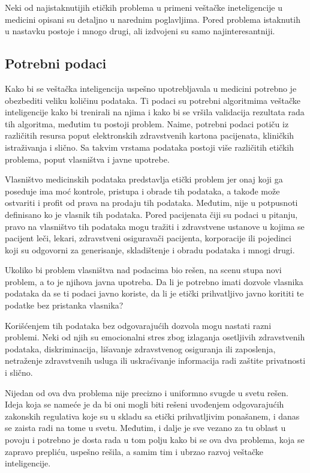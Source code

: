 \documentclass[a4paper]{article}
\begin{document}
Neki od najistaknutijih etičkih problema u primeni veštačke ineteligencije u medicini opisani su detaljno u narednim poglavljima. Pored problema istaknutih u nastavku postoje i mnogo drugi, ali izdvojeni su samo najinteresantniji.

\subsection{Potrebni podaci}
\label{subsec:poreklo_podataka}

Kako bi se veštačka inteligencija uspešno upotrebljavala u medicini potrebno je obezbediti veliku količinu podataka. Ti podaci su potrebni algoritmima veštačke inteligencije kako bi trenirali na njima i kako bi se vršila validacija rezultata rada tih algoritma, međutim tu postoji problem. Naime, potrebni podaci potiču iz različitih resursa poput elektronskih zdravstvenih kartona pacijenata, kliničkih istraživanja i slično. Sa takvim vrstama podataka postoji više različitih etičkih problema, poput vlasništva i javne upotrebe.

Vlasništvo medicinskih podataka predstavlja etički problem jer onaj koji ga poseduje ima moć kontrole, pristupa i obrade tih podataka, a takođe može ostvariti i profit od prava na prodaju tih podataka. Međutim, nije u potpusnoti definisano ko je vlasnik tih podataka. Pored pacijenata čiji su podaci u pitanju, pravo na vlasništvo tih podataka mogu tražiti i zdravstvene ustanove u kojima se pacijent leči, lekari, zdravstveni osiguravači pacijenta, korporacije ili pojedinci koji su odgovorni za generisanje, skladištenje i obradu podataka i mnogi drugi.

Ukoliko bi problem vlasništva nad podacima bio rešen, na scenu stupa novi problem, a to je njihova javna upotreba. Da li je potrebno imati dozvole vlasnika podataka da se ti podaci javno koriste, da li je etički prihvatljivo javno korititi te podatke bez pristanka vlasnika?

Korišćenjem tih podataka bez odgovarajućih dozvola mogu nastati razni problemi. Neki od njih su emocionalni stres zbog izlaganja osetljivih zdravstvenih podataka, diskriminacija, lišavanje zdravstvenog osiguranja ili zaposlenja, netraženje zdravstvenih usluga ili uskraćivanje informacija radi zaštite privatnosti i slično.

Nijedan od ova dva problema nije precizno i uniformno svugde u svetu rešen. Ideja koja se nameće je da bi oni mogli biti rešeni uvođenjem odgovarajućih zakonskih regulativa koje su u skladu sa etički prihvatljivim ponašanem, i danas se zaista radi na tome u svetu. Međutim, i dalje je sve vezano za tu oblast u povoju i potrebno je dosta rada u tom polju kako bi se ova dva problema, koja se zapravo prepliću, uspešno rešila, a samim tim i ubrzao razvoj veštačke inteligencije. \cite{ai_in_medicine}
\end{document}
